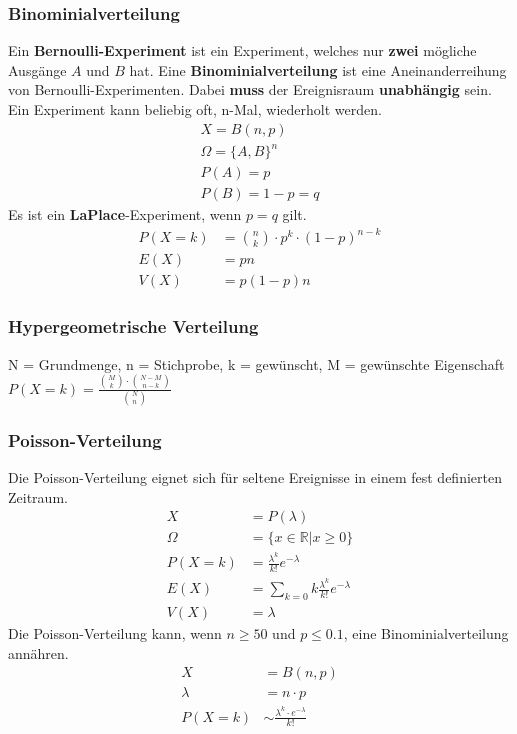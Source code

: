 \documentclass[a4paper, 8pt, landscape]{extarticle}
\let\oldsum\sum
\renewcommand{\sum}{\ensuremath{\textstyle\oldsum}}
\begin{document}
\begin{multicols*}{5}
			\subsubsection{Binominialverteilung}
			    Ein \textbf{Bernoulli-Experiment} ist ein Experiment, welches nur \textbf{zwei} mögliche Ausgänge $A$ und $B$ hat. Eine \textbf{Binominialverteilung} ist eine Aneinanderreihung von Bernoulli-Experimenten. Dabei \textbf{muss} der Ereignisraum \textbf{unabhängig} sein. Ein Experiment kann beliebig oft, n-Mal, wiederholt werden.
				\begin{align*}
					X = B(n, p)\\
					\Omega = \{A, B\}^n\\
					P(A) = p\\
					P(B) = 1 - p = q
				\end{align*}
	    		Es ist ein \textbf{LaPlace}-Experiment, wenn $p = q$ gilt.
			    \begin{align*}
				    P(X = k) &= \binom{n}{k} \cdot p^k \cdot (1-p)^{n-k}\\
				    E(X)&=pn\\
				    V(X)&=p(1-p)n
			    \end{align*}
			\subsubsection{Hypergeometrische Verteilung}
				N = Grundmenge, n = Stichprobe, k = gewünscht, M = gewünschte Eigenschaft\\
					$P(X = k) = \frac{{M \choose k} \cdot {N - M \choose n - k}}{{N \choose n}}$
		    \subsubsection{Poisson-Verteilung}
			    Die Poisson-Verteilung eignet sich für seltene Ereignisse in einem fest definierten Zeitraum.
			    \begin{align*}
				    X &= P(\lambda)\\
				    \Omega &= \{x \in \mathbb{R} | x \geq 0\}\\
				    P(X = k) &= \frac{\lambda^k}{k!} e^{-\lambda}\\
				    E(X)&=\sum_{k=0}k\frac{\lambda^k}{k!}e^{-\lambda}\\
				   	V(X)&=\lambda
			    \end{align*}
			    Die Poisson-Verteilung kann, wenn $n \ge 50$ und $p \leq 0.1$, eine Binominialverteilung annähren.\\
			    \begin{align*}
				    X &= B(n, p) \\
				    \lambda &= n \cdot p \\
				    P(X = k) &\sim \frac{\lambda^k \cdot e^{-\lambda}}{k!}
			    \end{align*}

\end{multicols*}
\end{document}
